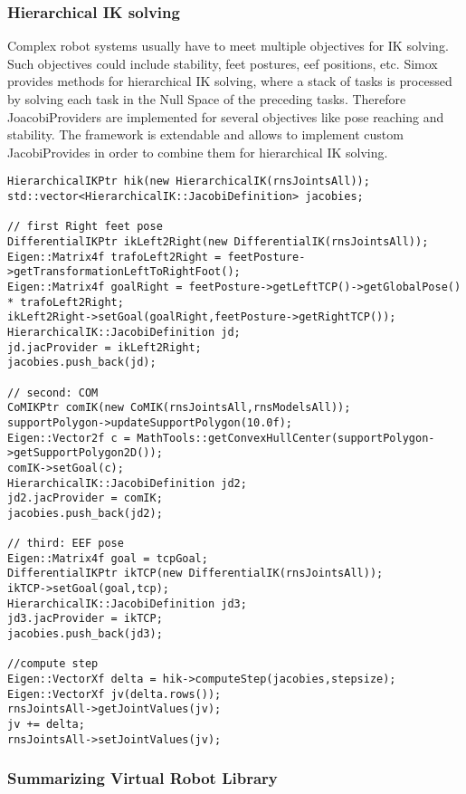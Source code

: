 \subsubsection*{Hierarchical IK solving}
Complex robot systems usually have to meet multiple objectives for IK solving. Such objectives could include stability, feet postures, eef positions, etc. Simox provides methods for hierarchical IK solving, where a stack of tasks is processed by solving each task in the Null Space of the preceding tasks. Therefore JoacobiProviders are implemented for several objectives like pose reaching and stability. The framework is extendable and allows to implement custom JacobiProvides in order to combine them for hierarchical IK solving.
\begin{lstlisting}
HierarchicalIKPtr hik(new HierarchicalIK(rnsJointsAll));
std::vector<HierarchicalIK::JacobiDefinition> jacobies;

// first Right feet pose
DifferentialIKPtr ikLeft2Right(new DifferentialIK(rnsJointsAll));
Eigen::Matrix4f trafoLeft2Right = feetPosture->getTransformationLeftToRightFoot();
Eigen::Matrix4f goalRight = feetPosture->getLeftTCP()->getGlobalPose() * trafoLeft2Right;
ikLeft2Right->setGoal(goalRight,feetPosture->getRightTCP());
HierarchicalIK::JacobiDefinition jd;
jd.jacProvider = ikLeft2Right;
jacobies.push_back(jd);

// second: COM
CoMIKPtr comIK(new CoMIK(rnsJointsAll,rnsModelsAll));
supportPolygon->updateSupportPolygon(10.0f);
Eigen::Vector2f c = MathTools::getConvexHullCenter(supportPolygon->getSupportPolygon2D());
comIK->setGoal(c); 
HierarchicalIK::JacobiDefinition jd2;
jd2.jacProvider = comIK;
jacobies.push_back(jd2);

// third: EEF pose
Eigen::Matrix4f goal = tcpGoal;
DifferentialIKPtr ikTCP(new DifferentialIK(rnsJointsAll));
ikTCP->setGoal(goal,tcp);
HierarchicalIK::JacobiDefinition jd3;
jd3.jacProvider = ikTCP;
jacobies.push_back(jd3);

//compute step
Eigen::VectorXf delta = hik->computeStep(jacobies,stepsize);
Eigen::VectorXf jv(delta.rows());
rnsJointsAll->getJointValues(jv);
jv += delta;
rnsJointsAll->setJointValues(jv);
\end{lstlisting}
\subsubsection*{Summarizing Virtual Robot Library}

